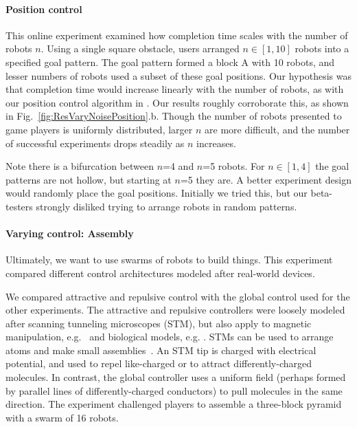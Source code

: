 \paragraph{Position control}
This online experiment examined how completion time scales with the number of robots $n$. Using a single square obstacle, users arranged $n\in[1,10]$ robots into a specified goal pattern.  The goal pattern formed a block  {\sffamily A} with 10 robots, and lesser numbers of robots used a subset of these goal positions. Our hypothesis was that completion time would increase linearly with the number of robots, as with our position control algorithm in \cite{Becker2013b}.  Our results roughly corroborate this, as shown in Fig.~\ref{fig:ResVaryNoisePosition}.b.  Though the number of robots presented to game players is uniformly distributed, larger $n$ are more difficult, and the number of successful experiments drops steadily as $n$ increases.



Note there is a bifurcation between $n$=4 and $n$=5 robots. For $n\in[1,4]$ the goal patterns are not hollow, but starting at $n$=5 they are.  A better experiment design would randomly place the goal positions.  Initially we tried this, but our beta-testers strongly disliked trying to arrange robots in random patterns.


\paragraph{Varying control: Assembly}
Ultimately, we want to use swarms of robots to build things. This experiment compared different control architectures modeled after real-world devices.

We compared attractive and repulsive control with the global control used for the other experiments. The attractive and repulsive controllers were loosely modeled after scanning tunneling microscopes (STM), but also apply to magnetic manipulation, e.g.\ \cite{Khalil2013} and biological models, e.g. \cite{goodrich2012types}. STMs can be used to arrange atoms and make small assemblies~\cite{avouris1995manipulation}. An STM tip is charged with electrical potential, and used to repel like-charged or to attract differently-charged molecules. In contrast, the global controller uses a uniform field (perhaps formed by parallel lines of differently-charged conductors) to pull molecules in the same direction.
The experiment challenged players to assemble a three-block pyramid with a swarm of 16 robots.

